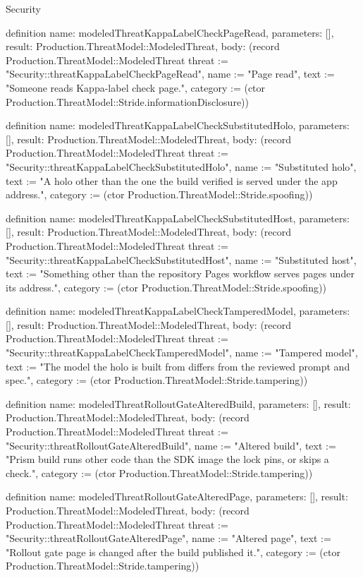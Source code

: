 \begin{lexlean}{Security}
\begin{semanticmodule}
definition{
  name: modeledThreatKappaLabelCheckPageRead,
  parameters: [],
  result: Production.ThreatModel::ModeledThreat,
  body: (record Production.ThreatModel::ModeledThreat {threat := "Security::threatKappaLabelCheckPageRead", name := "Page read", text := "Someone reads Kappa-label check page.", category := (ctor Production.ThreatModel::Stride.informationDisclosure)})
}

definition{
  name: modeledThreatKappaLabelCheckSubstitutedHolo,
  parameters: [],
  result: Production.ThreatModel::ModeledThreat,
  body: (record Production.ThreatModel::ModeledThreat {threat := "Security::threatKappaLabelCheckSubstitutedHolo", name := "Substituted holo", text := "A holo other than the one the build verified is served under the app address.", category := (ctor Production.ThreatModel::Stride.spoofing)})
}

definition{
  name: modeledThreatKappaLabelCheckSubstitutedHost,
  parameters: [],
  result: Production.ThreatModel::ModeledThreat,
  body: (record Production.ThreatModel::ModeledThreat {threat := "Security::threatKappaLabelCheckSubstitutedHost", name := "Substituted host", text := "Something other than the repository Pages workflow serves pages under its address.", category := (ctor Production.ThreatModel::Stride.spoofing)})
}

definition{
  name: modeledThreatKappaLabelCheckTamperedModel,
  parameters: [],
  result: Production.ThreatModel::ModeledThreat,
  body: (record Production.ThreatModel::ModeledThreat {threat := "Security::threatKappaLabelCheckTamperedModel", name := "Tampered model", text := "The model the holo is built from differs from the reviewed prompt and spec.", category := (ctor Production.ThreatModel::Stride.tampering)})
}

definition{
  name: modeledThreatRolloutGateAlteredBuild,
  parameters: [],
  result: Production.ThreatModel::ModeledThreat,
  body: (record Production.ThreatModel::ModeledThreat {threat := "Security::threatRolloutGateAlteredBuild", name := "Altered build", text := "Prism build runs other code than the SDK image the lock pins, or skips a check.", category := (ctor Production.ThreatModel::Stride.tampering)})
}

definition{
  name: modeledThreatRolloutGateAlteredPage,
  parameters: [],
  result: Production.ThreatModel::ModeledThreat,
  body: (record Production.ThreatModel::ModeledThreat {threat := "Security::threatRolloutGateAlteredPage", name := "Altered page", text := "Rollout gate page is changed after the build published it.", category := (ctor Production.ThreatModel::Stride.tampering)})
}


\end{semanticmodule}
\end{lexlean}
